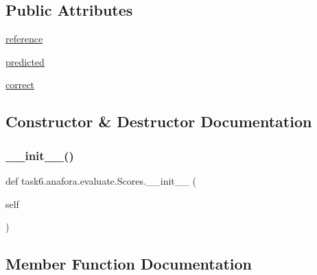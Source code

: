 \subsection*{Public Attributes}
\begin{DoxyCompactItemize}
\item 
\hyperlink{classtask6_1_1anafora_1_1evaluate_1_1Scores_a9c17cca5f0fea67554a3509fef3b7cb5}{reference}
\item 
\hyperlink{classtask6_1_1anafora_1_1evaluate_1_1Scores_ae1bf8971c36ccbe9f991c6b21a52bf9d}{predicted}
\item 
\hyperlink{classtask6_1_1anafora_1_1evaluate_1_1Scores_a662698d04134feb1544f159cca191be5}{correct}
\end{DoxyCompactItemize}


\subsection{Constructor \& Destructor Documentation}
\mbox{\label{classtask6_1_1anafora_1_1evaluate_1_1Scores_aed52bae7b392d0c1c81faaec45287997}} 
\subsubsection{\texorpdfstring{\+\_\+\+\_\+init\+\_\+\+\_\+()}{\_\_init\_\_()}}
{\footnotesize\ttfamily def task6.\+anafora.\+evaluate.\+Scores.\+\_\+\+\_\+init\+\_\+\+\_\+ (\begin{DoxyParamCaption}\item[{}]{self }\end{DoxyParamCaption})}



\subsection{Member Function Documentation}
\mbox{\label{classtask6_1_1anafora_1_1evaluate_1_1Scores_adbd10448e0f7c750c4ffc33b70929989}} 
